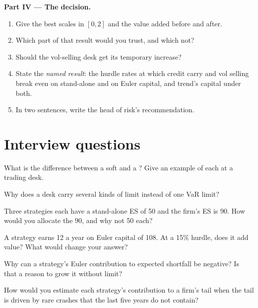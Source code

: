 \begin{problem}
\medskip\noindent\textbf{Part IV --- The decision.}
\begin{enumerate}[resume]
\item Give the best scales in $[0,2]$ and the value added before and after.
\item Which part of that result would you trust, and which not?
\item Should the vol-selling desk get its temporary increase?
\item State the \emph{named result}: the hurdle rates at which credit carry and vol selling break even on stand-alone and on Euler capital, and
trend's capital under both.
\item In two sentences, write the head of risk's recommendation.
\end{enumerate}
\end{problem}

\section{Interview questions}

\begin{interviewq}\label{iq:fm:limits-and-capital-allocation:1}
What is the difference between a soft and a ? Give an example of each at a trading desk.
\end{interviewq}

\begin{interviewq}\label{iq:fm:limits-and-capital-allocation:2}
Why does a desk carry several kinds of limit instead of one VaR limit?
\end{interviewq}

\begin{interviewq}\label{iq:fm:limits-and-capital-allocation:3}
Three strategies each have a stand-alone ES of 50 and the firm's ES is 90. How would you allocate the 90, and why not 50 each?
\end{interviewq}

\begin{interviewq}\label{iq:fm:limits-and-capital-allocation:4}
A strategy earns 12 a year on Euler capital of 108. At a 15\% hurdle, does it add value? What would change your answer?
\end{interviewq}

\begin{interviewq}\label{iq:fm:limits-and-capital-allocation:5}
Why can a strategy's Euler contribution to expected shortfall be negative? Is that a reason to grow it without limit?
\end{interviewq}

\begin{interviewq}\label{iq:fm:limits-and-capital-allocation:6}
How would you estimate each strategy's contribution to a firm's tail when the tail is driven by rare crashes that the last five years do not
contain?
\end{interviewq}
